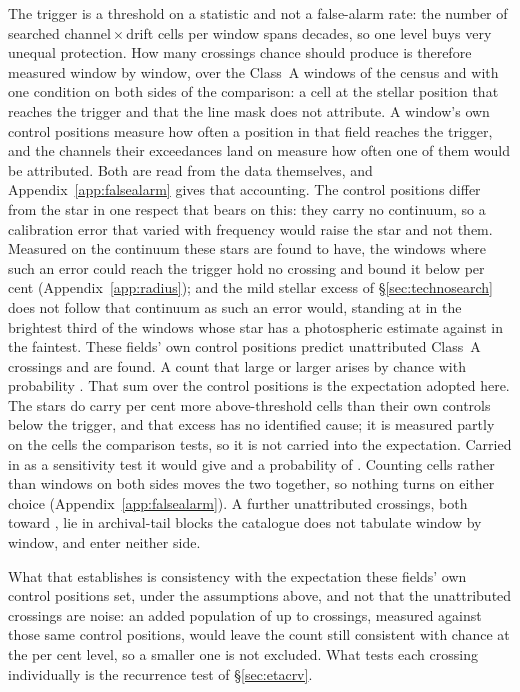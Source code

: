 The trigger is a threshold on a statistic and not a false-alarm rate: the
number of searched channel\,$\times$\,drift cells per window spans
\TuCellsDecades{} decades, so one level buys very unequal protection. How
many crossings chance should produce is therefore measured window by window,
over the \CeNWin{} Class~A windows of the census and with one condition on
both sides of the comparison: a cell at the stellar position that reaches the
trigger and that the line mask does not attribute. A window's own \NCtrl{} control positions measure how often a position in
that field reaches the trigger, and the channels their exceedances land on
measure how often one of them would be attributed. Both are read from the
data themselves, and Appendix~\ref{app:falsealarm} gives that accounting. The control positions differ from the star in one respect that
bears on this: they carry no continuum, so a calibration error that varied
with frequency would raise the star and not them. Measured on the continuum
these stars are found to have, the windows where such an error could reach
the trigger hold no crossing and bound it below \CxResidHiPct{} per cent
(Appendix~\ref{app:radius}); and the mild stellar excess of
\S\ref{sec:technosearch} does not follow that continuum as such an error
would, standing at \CkRatioContBright{} in the brightest third of the
\CkNContWin{} windows whose star has a photospheric estimate against
\CkRatioContFaint{} in the faintest. These fields' own control positions predict \CeExp{} unattributed
Class~A crossings and \CeObs{} are found. A count that large or larger arises
by chance with probability \CeProbNull. That sum over the control positions
is the expectation adopted here. The stars do carry \CeStepPct{} per cent
more above-threshold cells than their own controls below the trigger, and
that excess has no identified cause; it is measured partly on the cells the
comparison tests, so it is not carried into the expectation. Carried in as a
sensitivity test it would give \CeExpX{} and a probability of \CeProbStep.
Counting cells rather than windows on both sides moves the two
together, so nothing turns on either choice (Appendix~\ref{app:falsealarm}). A further \CeNTailCrossWord{} unattributed
crossings, both toward \CeTailStar, lie in archival-tail blocks the catalogue
does not tabulate window by window, and enter neither side.

What that establishes is consistency with the expectation these fields' own
control positions set, under the assumptions above, and not that the
unattributed crossings are noise: an added population of up to \CeAddLim{}
crossings, measured against those same control positions, would leave the
count still consistent with chance at the \CeCovPct{} per cent level, so a
smaller one is not excluded. What tests each crossing individually is the
recurrence test of \S\ref{sec:etacrv}.

